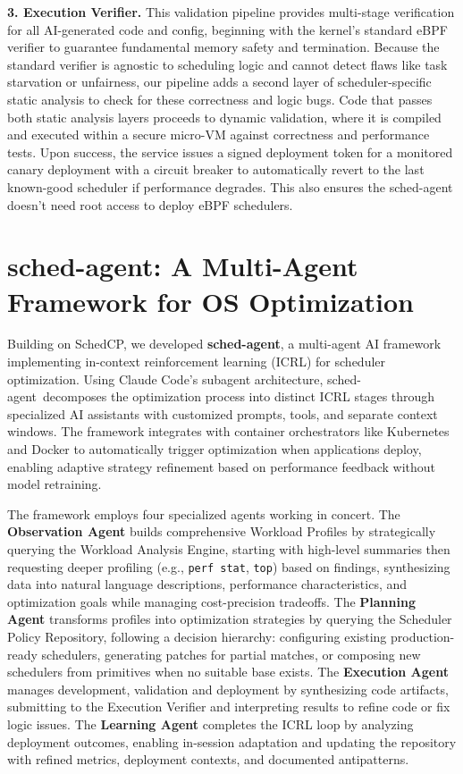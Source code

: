 \documentclass[preprint]{article}
\newcommand{\sys}{SchedCP\xspace}
\newcommand{\agent}{sched-agent\xspace}
\begin{document}
\textbf{3. Execution Verifier.} This validation pipeline provides multi-stage verification for all AI-generated code and config, beginning with the kernel's standard eBPF verifier to guarantee fundamental memory safety and termination. Because the standard verifier is agnostic to scheduling logic and cannot detect flaws like task starvation or unfairness, our pipeline adds a second layer of scheduler-specific static analysis to check for these correctness and logic bugs. Code that passes both static analysis layers proceeds to dynamic validation, where it is compiled and executed within a secure micro-VM against correctness and performance tests. Upon success, the service issues a signed deployment token for a monitored canary deployment with a circuit breaker to automatically revert to the last known-good scheduler if performance degrades. This also ensures the \agent doesn't need root access to deploy eBPF schedulers.

\section{\agent: A Multi-Agent Framework for OS Optimization}
\label{sec:sched_agents}

Building on \sys, we developed \textbf{\agent}, a multi-agent AI framework implementing in-context reinforcement learning (ICRL)\cite{incontextrl} for scheduler optimization. Using Claude Code's subagent architecture\cite{anthropic2024subagents}, \agent\ decomposes the optimization process into distinct ICRL stages through specialized AI assistants with customized prompts, tools, and separate context windows\cite{anthropic2024multiagent}. The framework integrates with container orchestrators like Kubernetes and Docker to automatically trigger optimization when applications deploy, enabling adaptive strategy refinement based on performance feedback without model retraining.

The framework employs four specialized agents working in concert. The \textbf{Observation Agent} builds comprehensive Workload Profiles by strategically querying the Workload Analysis Engine, starting with high-level summaries then requesting deeper profiling (e.g., \texttt{perf stat}, \texttt{top}) based on findings, synthesizing data into natural language descriptions, performance characteristics, and optimization goals while managing cost-precision tradeoffs. The \textbf{Planning Agent} transforms profiles into optimization strategies by querying the Scheduler Policy Repository, following a decision hierarchy: configuring existing production-ready schedulers, generating patches for partial matches, or composing new schedulers from primitives when no suitable base exists. The \textbf{Execution Agent} manages development, validation and deployment by synthesizing code artifacts, submitting to the Execution Verifier and interpreting results to refine code or fix logic issues. The \textbf{Learning Agent} completes the ICRL loop by analyzing deployment outcomes, enabling in-session adaptation and updating the repository with refined metrics, deployment contexts, and documented antipatterns.
\end{document}
